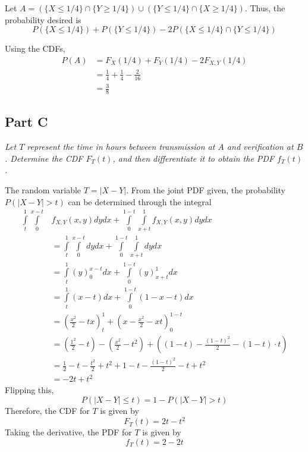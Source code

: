 \documentclass{article}
\begin{document}
\bigbreak

Let $A = \left(\{X \leq 1/4\} \cap \{Y \geq 1/4\}\right) \cup \left(\{Y \leq
1/4\} \cap \{X \geq 1/4\}\right)$. Thus, the probability desired is
$$ P(\{X \leq 1/4\}) + P(\{Y \leq 1/4\}) - 2 P(\{X \leq 1/4\} \cap \{Y \leq
1/4\}) $$

Using the CDFs,
\begin{align*}
    P(A) &= F_X(1/4) + F_Y(1/4) - 2 F_{X,Y}(1/4) \\
    &= \frac{1}{4} + \frac{1}{4} - \frac{2}{16} \\
    &= \frac{3}{8} 
\end{align*}

\subsection*{Part C}

\textit{Let $T$ represent the time in hours between transmission at $A$ and
verification at $B$. Determine the CDF $F_T(t)$, and then differentiate it to
obtain the PDF $f_T(t)$.}

\bigbreak

The random variable $T = |X - Y|$. From the joint PDF given, the probability
$P(|X - Y| > t)$ can be determined through the integral
\begin{align*}
    \int\limits_t^1\int\limits_0^{x - t} &f_{X,Y}(x, y) dy dx +
    \int\limits_0^{1 - t}\int\limits_{x + t}^1 f_{X,Y}(x, y) dy dx \\
    &= \int\limits_t^1\int\limits_0^{x - t} dy dx + \int\limits_0^{1 -
    t}\int\limits_{x + t}^1 dy dx \\
    &= \int\limits_t^1 \left(y\right)_0^{x - t} dx + \int\limits_0^{1 - t} \left(y\right)_{x + t}^1 dx \\
    &= \int\limits_t^1 (x - t) dx + \int\limits_0^{1 - t} (1 - x - t) dx \\
    &= \left(\frac{x^2}{2} - tx\right)_t^1 + \left(x - \frac{x^2}{2} - xt\right)_0^{1 - t} \\
    &= \left(\frac{1^2}{2} - t\right) - \left(\frac{x^2}{2} - t^2\right) + \left(\left(1 - t\right) - \frac{(1 - t)^2}{2} - \left(1 - t\right) \cdot t \right) \\
    &= \frac{1}{2} - t - \frac{t^2}{2} + t^2 + 1 - t - \frac{(1 - t)^2}{2} - t + t^2 \\
    &= -2t + t^2
\end{align*}
Flipping this,
$$ P(|X - Y| \leq t) = 1 - P(|X - Y| > t) $$
Therefore, the CDF for $T$ is given by
$$ F_T(t) = 2t - t^2 $$
Taking the derivative, the PDF for $T$ is given by
$$ f_T(t) = 2 - 2t $$
\end{document}
